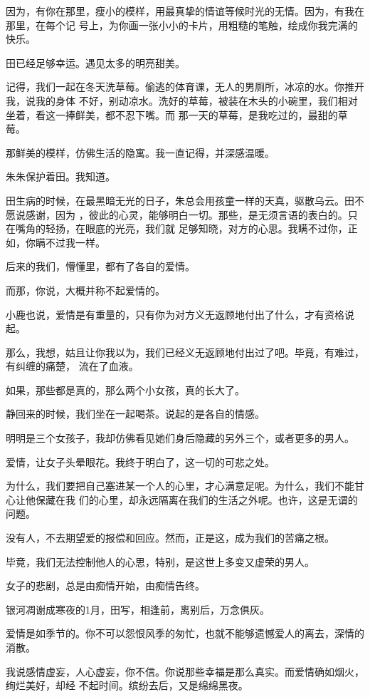 \documentclass[12pt,a4paper]{article}
\begin{document}
		因为，有你在那里，瘦小的模样，用最真挚的情谊等候时光的无情。因为，有我在那里，在每个记
	号上，为你画一张小小的卡片，用粗糙的笔触，绘成你我完满的快乐。

		田已经足够幸运。遇见太多的明亮甜美。

		记得，我们一起在冬天洗草莓。偷逃的体育课，无人的男厕所，冰凉的水。你推开我，说我的身体
	不好，别动凉水。洗好的草莓，被装在木头的小碗里，我们相对坐着，看这一捧鲜美，都不忍下嘴。而
	那一天的草莓，是我吃过的，最甜的草莓。

		那鲜美的模样，仿佛生活的隐寓。我一直记得，并深感温暖。

		朱朱保护着田。我知道。


		田生病的时候，在最黑暗无光的日子，朱总会用孩童一样的天真，驱散乌云。田不愿说感谢，因为
	，彼此的心灵，能够明白一切。那些，是无须言语的表白的。只在嘴角的轻扬，在眼底的光亮，我们就
	足够知晓，对方的心思。我瞒不过你，正如，你瞒不过我一样。

		后来的我们，懵懂里，都有了各自的爱情。

		而那，你说，大概并称不起爱情的。

		小鹿也说，爱情是有重量的，只有你为对方义无返顾地付出了什么，才有资格说起。

		那么，我想，姑且让你我以为，我们已经义无返顾地付出过了吧。毕竟，有难过，有纠缠的痛楚，
	流在了血液。

		如果，那些都是真的，那么两个小女孩，真的长大了。


		静回来的时候，我们坐在一起喝茶。说起的是各自的情感。

		明明是三个女孩子，我却仿佛看见她们身后隐藏的另外三个，或者更多的男人。

		爱情，让女子头晕眼花。我终于明白了，这一切的可悲之处。


		为什么，我们要把自己塞进某一个人的心里，才心满意足呢。为什么，我们不能甘心让他保藏在我
	们的心里，却永远隔离在我们的生活之外呢。也许，这是无谓的问题。

		没有人，不去期望爱的报偿和回应。然而，正是这，成为我们的苦痛之根。\par
		毕竟，我们无法控制他人的心思，特别，是这世上多变又虚荣的男人。\par
		女子的悲剧，总是由痴情开始，由痴情告终。


		银河凋谢成寒夜的1月，田写，相逢前，离别后，万念俱灰。\par
		爱情是如季节的。你不可以怨恨风季的匆忙，也就不能够遗憾爱人的离去，深情的消散。

		我说感情虚妄，人心虚妄，你不信。你说那些幸福是那么真实。而爱情确如烟火，绚烂美好，却经
	不起时间。缤纷去后，又是绵绵黑夜。
\end{document}
